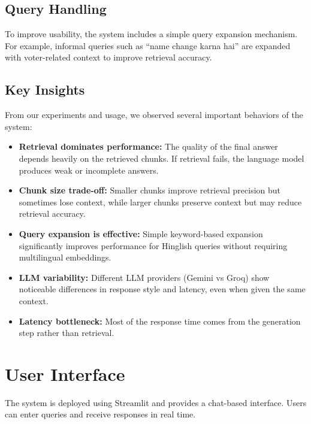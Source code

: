 \documentclass[11pt,a4paper]{article}
\begin{document}
\subsection{Query Handling}

To improve usability, the system includes a simple query expansion mechanism. For example, informal queries such as ``name change karna hai'' are expanded with voter-related context to improve retrieval accuracy.

\subsection{Key Insights}

From our experiments and usage, we observed several important behaviors of the system:

\begin{itemize}
    \item \textbf{Retrieval dominates performance:} The quality of the final answer depends heavily on the retrieved chunks. If retrieval fails, the language model produces weak or incomplete answers.
    
    \item \textbf{Chunk size trade-off:} Smaller chunks improve retrieval precision but sometimes lose context, while larger chunks preserve context but may reduce retrieval accuracy.
    
    \item \textbf{Query expansion is effective:} Simple keyword-based expansion significantly improves performance for Hinglish queries without requiring multilingual embeddings.
    
    \item \textbf{LLM variability:} Different LLM providers (Gemini vs Groq) show noticeable differences in response style and latency, even when given the same context.
    
    \item \textbf{Latency bottleneck:} Most of the response time comes from the generation step rather than retrieval.
\end{itemize}



\section{User Interface}

The system is deployed using Streamlit and provides a chat-based interface. Users can enter queries and receive responses in real time.
\end{document}
